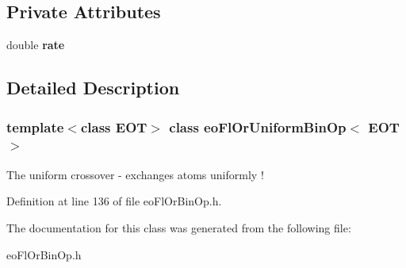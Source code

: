 \subsection*{Private Attributes}
\begin{CompactItemize}
\item 
double {\bf rate}\label{classeo_fl_or_uniform_bin_op_r0}

\end{CompactItemize}


\subsection{Detailed Description}
\subsubsection*{template$<$class EOT$>$ class eo\-Fl\-Or\-Uniform\-Bin\-Op$<$ EOT $>$}

The uniform crossover - exchanges atoms uniformly ! 



Definition at line 136 of file eo\-Fl\-Or\-Bin\-Op.h.

The documentation for this class was generated from the following file:\begin{CompactItemize}
\item 
eo\-Fl\-Or\-Bin\-Op.h\end{CompactItemize}
